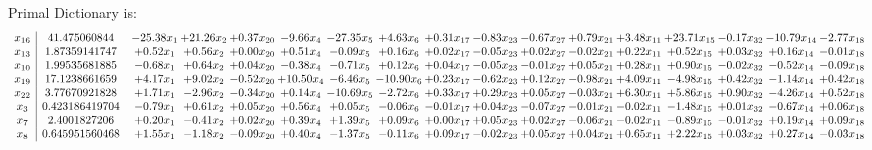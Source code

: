 \documentclass[9pt]{article}
\begin{document}
Primal Dictionary is:
\[\begin{array}{c| c c@{\hskip 2pt} c@{\hskip 2pt} c@{\hskip 2pt} c@{\hskip 2pt} c@{\hskip 2pt} c@{\hskip 2pt} c@{\hskip 2pt} c@{\hskip 2pt} c@{\hskip 2pt} c@{\hskip 2pt} c@{\hskip 2pt} c@{\hskip 2pt} c@{\hskip 2pt} c@{\hskip 2pt} c@{\hskip 2pt} }
 x_{16}   &  41.475060844 & -25.38 x_{1} & + 21.26 x_{2} & +  0.37 x_{20} & -9.66 x_{4} & -27.35 x_{5} & +  4.63 x_{6} & +  0.31 x_{17} & -0.83 x_{23} & -0.67 x_{27} & +  0.79 x_{21} & +  3.48 x_{11} & + 23.71 x_{15} & -0.17 x_{32} & -10.79 x_{14} & -2.77 x_{18}\\
 x_{13}   &  1.87359141747 & +  0.52 x_{1} & +  0.56 x_{2} & +  0.00 x_{20} & +  0.51 x_{4} & -0.09 x_{5} & +  0.16 x_{6} & +  0.02 x_{17} & -0.05 x_{23} & +  0.02 x_{27} & -0.02 x_{21} & +  0.22 x_{11} & +  0.52 x_{15} & +  0.03 x_{32} & +  0.16 x_{14} & -0.01 x_{18}\\
 x_{10}   &  1.99535681885 & -0.68 x_{1} & +  0.64 x_{2} & +  0.04 x_{20} & -0.38 x_{4} & -0.71 x_{5} & +  0.12 x_{6} & +  0.04 x_{17} & -0.05 x_{23} & -0.01 x_{27} & +  0.05 x_{21} & +  0.28 x_{11} & +  0.90 x_{15} & -0.02 x_{32} & -0.52 x_{14} & -0.09 x_{18}\\
 x_{19}   &  17.1238661659 & +  4.17 x_{1} & +  9.02 x_{2} & -0.52 x_{20} & + 10.50 x_{4} & -6.46 x_{5} & -10.90 x_{6} & +  0.23 x_{17} & -0.62 x_{23} & +  0.12 x_{27} & -0.98 x_{21} & +  4.09 x_{11} & -4.98 x_{15} & +  0.42 x_{32} & -1.14 x_{14} & +  0.42 x_{18}\\
 x_{22}   &  3.77670921828 & +  1.71 x_{1} & -2.96 x_{2} & -0.34 x_{20} & +  0.14 x_{4} & -10.69 x_{5} & -2.72 x_{6} & +  0.33 x_{17} & +  0.29 x_{23} & +  0.05 x_{27} & -0.03 x_{21} & +  6.30 x_{11} & +  5.86 x_{15} & +  0.90 x_{32} & -4.26 x_{14} & +  0.52 x_{18}\\
 x_{3}   &  0.423186419704 & -0.79 x_{1} & +  0.61 x_{2} & +  0.05 x_{20} & +  0.56 x_{4} & +  0.05 x_{5} & -0.06 x_{6} & -0.01 x_{17} & +  0.04 x_{23} & -0.07 x_{27} & -0.01 x_{21} & -0.02 x_{11} & -1.48 x_{15} & +  0.01 x_{32} & -0.67 x_{14} & +  0.06 x_{18}\\
 x_{7}   &  2.4001827206 & +  0.20 x_{1} & -0.41 x_{2} & +  0.02 x_{20} & +  0.39 x_{4} & +  1.39 x_{5} & +  0.09 x_{6} & +  0.00 x_{17} & +  0.05 x_{23} & +  0.02 x_{27} & -0.06 x_{21} & -0.02 x_{11} & -0.89 x_{15} & -0.01 x_{32} & +  0.19 x_{14} & +  0.09 x_{18}\\
 x_{8}   &  0.645951560468 & +  1.55 x_{1} & -1.18 x_{2} & -0.09 x_{20} & +  0.40 x_{4} & -1.37 x_{5} & -0.11 x_{6} & +  0.09 x_{17} & -0.02 x_{23} & +  0.05 x_{27} & +  0.04 x_{21} & +  0.65 x_{11} & +  2.22 x_{15} & +  0.03 x_{32} & +  0.27 x_{14} & -0.03 x_{18}\\

\end{array}\]
\end{document}
